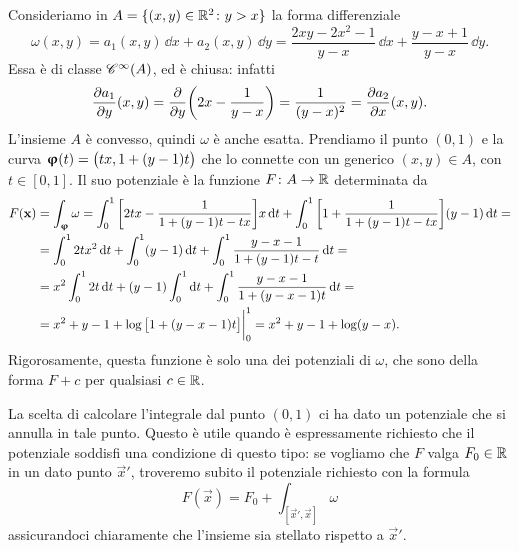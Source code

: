 \begin{esempio} \label{es:calcolo-potenziale}
	Consideriamo in $A=\{(x,y)\in\R^2\colon y>x\}$ la forma differenziale
	\begin{equation*}
		\omega(x,y)=a_1(x,y)\,\dd x+a_2(x,y)\,\dd y=\frac{2xy-2x^2-1}{y-x}\,\dd x+\frac{y-x+1}{y-x}\,\dd y.
	\end{equation*}
	Essa è di classe $\cont[\infty]{A}$, ed è chiusa: infatti
	\begin{equation}
		\drp{a_1}{y}(x,y)=\drp{}{y}\bigg(2x-\frac1{y-x}\bigg)=\frac1{(y-x)^2}=\drp{a_2}{x}(x,y).
	\end{equation}
	L'insieme $A$ è convesso, quindi $\omega$ è anche esatta.
	Prendiamo il punto $(0,1)$ e la curva $\vphi(t)=\big(tx,1+(y-1)t\big)$ che lo connette con un generico $(x,y)\in A$, con $t\in[0,1]$.
	Il suo potenziale è la funzione $F\colon A\to\R$ determinata da
	\begin{equation}
		\begin{split}
			F(\vec x)&=\int_{\vphi}\omega=\int_0^1\bigg[2tx-\frac1{1+(y-1)t-tx}\bigg]x\,\dd t+\int_0^1\bigg[1+\frac1{1+(y-1)t-tx}\bigg](y-1)\,\dd t=\\
			&=\int_0^12tx^2\,\dd t+\int_0^1(y-1)\,\dd t+\int_0^1\frac{y-x-1}{1+(y-1)t-t}\,\dd t=\\
			&=x^2\int_0^12t\,\dd t+(y-1)\int_0^1\dd t+\int_0^1\frac{y-x-1}{1+(y-x-1)t}\,\dd t=\\
			&=x^2+y-1+\log\big[1+(y-x-1)t\big]\bigg|_0^1=x^2+y-1+\log(y-x).
		\end{split}
	\end{equation}
	Rigorosamente, questa funzione è solo una dei potenziali di $\omega$, che sono della forma $F+c$ per qualsiasi $c\in\R$.
\end{esempio}
La scelta di calcolare l'integrale dal punto $(0,1)$ ci ha dato un potenziale che si annulla in tale punto.
Questo è utile quando è espressamente richiesto che il potenziale soddisfi una condizione di questo tipo: se vogliamo che $F$ valga $F_0\in\R$ in un dato punto $\vec x'$, troveremo subito il potenziale richiesto con la formula
\begin{equation}
	F(\vec x)=F_0+\int_{[\vec x',\vec x]}\omega
\end{equation}
assicurandoci chiaramente che l'insieme sia stellato rispetto a $\vec x'$.
